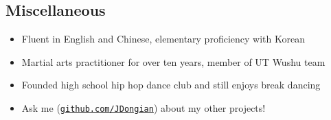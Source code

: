 \documentclass[line,margin]{res}
\begin{document}
\begin{resume}
\vspace{-8pt}
\section{Miscellaneous} 
\vspace{22pt}
    \begin{itemize} \itemsep -2pt %
    \item Fluent in English and Chinese, elementary proficiency with Korean
    \item Martial arts practitioner for over ten years, member of UT Wushu team
    \item Founded high school hip hop dance club and still enjoys break dancing
    \item Ask me (\href{https://www.github.com/JDongian}{\texttt{github.com/JDongian}}) about my other projects! 
    \end{itemize}

\end{resume} 
\end{document}
